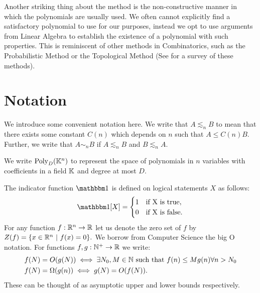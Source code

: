 Another striking thing about the method is the non-constructive manner in which the polynomials are usually used. 
We often cannot explicitly find a satisfactory polynomial to use for our purposes, instead we opt to use arguments from Linear Algebra to establish the
existence of a polynomial with such properties. This is reminiscent of other methods in Combinatorics, such as the Probabilistic Method or the Topological Method (See \cite{ALON2003} for a survey of these methods). 

\section{Notation}
We introduce some convenient notation here. We write that $A \lesssim_n B$ to mean that there exists some constant
$C(n)$ which depends on $n$ such that $A \leq C(n) B$. Further, we write that $A \sim_n B$ if $A \lesssim_n B$ and $B \lesssim_n A$.

We write $\text{Poly}_D (\mathbb K^n)$ to represent the space of polynomials in $n$ variables with coefficients in a field $\mathbb K$ and degree at most $D$.

The indicator function $\OO$ is defined on logical statements $X$ as follows:
\[
    \OO[X] = 
  \begin{cases}
      1 & \text{if X is true}, \\
      0 & \text{if X is false}.
  \end{cases}  
\]
For any function $f : \mathbb R^n \to \mathbb R$ let us denote the zero set of $f$ by $Z(f) = \{x \in \mathbb R^n \ | \ f(x) = 0\}.$
We borrow from Computer Science the big O notation. For functions $f,g : \mathbb N^+ \to \mathbb R$ we write:
\begin{align*}
    f(N) &= O(g(N)) \iff \exists N_0, M \in \mathbb N \text{ such that } f(n) \leq Mg(n) \forall n > N_0 \\
    f(N) &= \Omega(g(n)) \iff g(N) = O(f(N)).
\end{align*}
These can be thought of as asymptotic upper and lower bounds respectively.